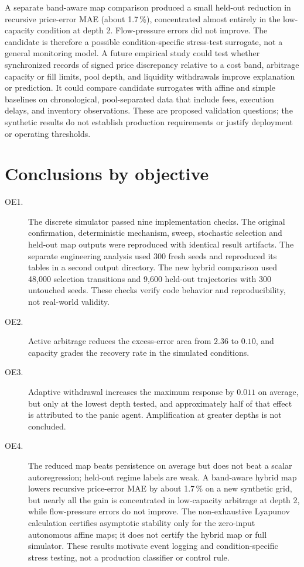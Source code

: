 A separate band-aware map comparison produced a small held-out reduction in recursive price-error MAE (about 1.7\,\%), concentrated almost entirely in the low-capacity condition at depth 2. Flow-pressure errors did not improve. The candidate is therefore a possible condition-specific stress-test surrogate, not a general monitoring model. A future empirical study could test whether synchronized records of signed price discrepancy relative to a cost band, arbitrage capacity or fill limits, pool depth, and liquidity withdrawals improve explanation or prediction. It could compare candidate surrogates with affine and simple baselines on chronological, pool-separated data that include fees, execution delays, and inventory observations. These are proposed validation questions; the synthetic results do not establish production requirements or justify deployment or operating thresholds.

\section{Conclusions by objective}

\begin{description}
  \item[OE1.] The discrete simulator passed nine implementation checks. The original confirmation, deterministic mechanism, sweep, stochastic selection and held-out map outputs were reproduced with identical result artifacts. The separate engineering analysis used 300 fresh seeds and reproduced its tables in a second output directory. The new hybrid comparison used 48,000 selection transitions and 9,600 held-out trajectories with 300 untouched seeds. These checks verify code behavior and reproducibility, not real-world validity.
  \item[OE2.] Active arbitrage reduces the excess-error area from $2.36$ to $0.10$, and capacity grades the recovery rate in the simulated conditions.
  \item[OE3.] Adaptive withdrawal increases the maximum response by $0.011$ on average, but only at the lowest depth tested, and approximately half of that effect is attributed to the panic agent. Amplification at greater depths is not concluded.
  \item[OE4.] The reduced map beats persistence on average but does not beat a scalar autoregression; held-out regime labels are weak. A band-aware hybrid map lowers recursive price-error MAE by about 1.7\,\% on a new synthetic grid, but nearly all the gain is concentrated in low-capacity arbitrage at depth 2, while flow-pressure errors do not improve. The non-exhaustive Lyapunov calculation certifies asymptotic stability only for the zero-input autonomous affine maps; it does not certify the hybrid map or full simulator. These results motivate event logging and condition-specific stress testing, not a production classifier or control rule.
\end{description}

